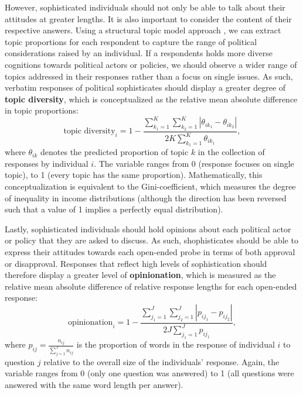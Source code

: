 \documentclass[12pt]{article}
\begin{document}
However, sophisticated individuals should not only be able to talk about their attitudes at greater lengths. It is also important to consider the content of their respective answers. Using a structural topic model approach \citep[e.g.,][]{roberts2014structural}, we can extract topic proportions for each respondent to capture the range of political considerations raised by an individual. %
If a respondents holds more diverse cognitions towards political actors or policies, we should observe a wider range of topics addressed in their responses rather than a focus on single issues. As such, verbatim responses of political sophisticates should display a greater degree of \textbf{topic diversity}, which is conceptualized as the relative mean absolute difference in topic proportions:
\begin{equation}
\text{topic diversity}_i = 1-\dfrac{\sum_{k_1=1}^K\sum_{k_2=1}^K |\theta_{ik_1} - \theta_{ik_2}|}{2K\sum_{k_1=1}^K \theta_{ik_1}},
\end{equation}
where $\theta_{ik}$ denotes the predicted proportion of topic $k$ in the collection of responses by individual $i$. The variable ranges from 0 (response focuses on single topic), to 1 (every topic has the same proportion). Mathematically, this conceptualization is equivalent to the Gini-coefficient, which measures the degree of inequality in income distributions (although the direction has been reversed such that a value of 1 implies a perfectly equal distribution).

Lastly, sophisticated individuals should hold opinions about each political actor or policy that they are asked to discuss. As such, shophisticates should be able to express their attitudes towards each open-ended probe in terms of both approval or disapproval. Responses that reflect high levels of sophistication should therefore display a greater level of \textbf{opinionation}, which is measured as the relative mean absolute difference of relative response lengths for each open-ended response:
\begin{equation}
\text{opinionation}_i = 1-\dfrac{\sum_{j_1=1}^J\sum_{j_2=1}^J |p_{ij_1} - p_{ij_2}|}{2J\sum_{j_1=1}^J p_{ij_1}},
\end{equation}
where $p_{ij}=\tfrac{n_{ij}}{\sum_{j=1}^J n_{ij}}$ is the proportion of words in the response of individual $i$ to question $j$ relative to the overall size of the individuals' response. Again, the variable ranges from 0 (only one question was answered) to 1 (all questions were answered with the same word length per answer).
\end{document}
